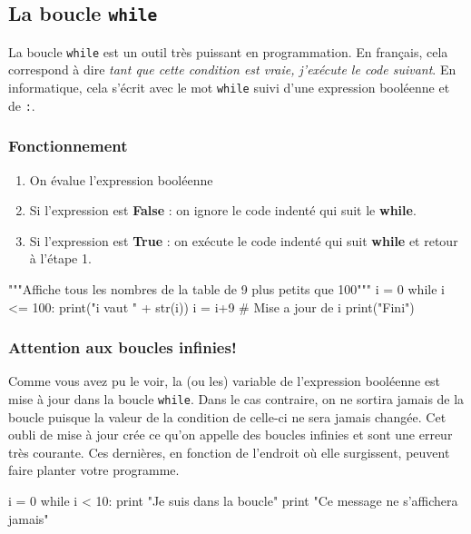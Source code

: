 \subsection{La boucle \texttt{while}}

La boucle \texttt{while} est un outil très puissant en programmation. En français, cela correspond à dire \textit{tant que cette condition est vraie, j'exécute le code suivant}. En informatique, cela s'écrit avec le mot \texttt{while} suivi d'une expression booléenne et de \texttt{:}.
\subsubsection{Fonctionnement}
\begin{enumerate}
    \item On évalue l'expression booléenne
    \item Si l'expression est \textbf{False} : on ignore le code indenté qui suit le \textbf{while}.
    \item Si l'expression est \textbf{True} : on exécute le code indenté qui suit \textbf{while} et retour à l'étape 1.
\end{enumerate} 

\begin{python}[caption = Exemple de boucle while]
"""Affiche tous les nombres de la table de 9 plus petits que 100"""
i = 0
while i <= 100:
	print("i vaut " + str(i))
	i = i+9	# Mise a jour de i
print("Fini")
\end{python}

\subsubsection{Attention aux boucles infinies!}

Comme vous avez pu le voir, la (ou les) variable de l'expression booléenne est mise à jour dans la boucle \texttt{while}. Dans le cas contraire, on ne sortira jamais de la boucle puisque la valeur de la condition de celle-ci ne sera jamais changée. Cet oubli de mise à jour crée ce qu'on appelle des boucles infinies et sont une erreur très courante. Ces dernières, en fonction de l'endroit où elle surgissent, peuvent faire planter votre programme.

\begin{python}[caption = Exemple de boucle infinie]
i = 0
while i < 10:
	print "Je suis dans la boucle"
print "Ce message ne s'affichera jamais"
\end{python}

